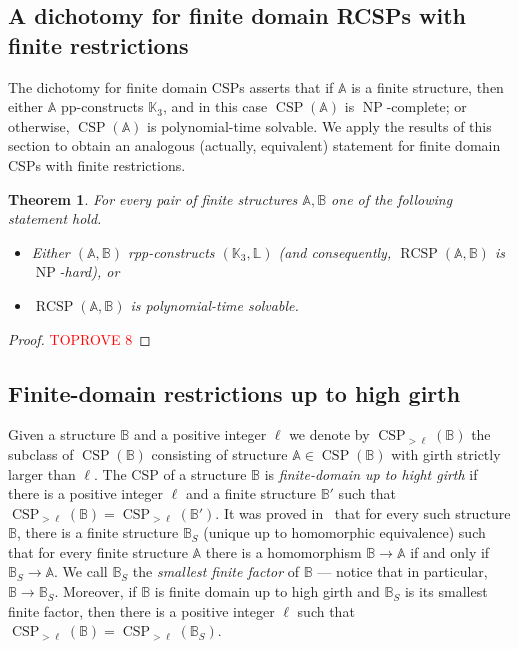 \documentclass{article}
\newtheorem{theorem}{Theorem}
\theoremstyle{definition}
\theoremstyle{remark}
\DeclareMathOperator{\NP}{NP}
\DeclareMathOperator{\CSP}{CSP}
\DeclareMathOperator{\RCSP}{RCSP}
\newcommand{\bA}{{\mathbb A}}
\newcommand{\bB}{{\mathbb B}}
\newcommand{\bK}{{\mathbb K}}
\newcommand{\bL}{{\mathbb L}}
\begin{document}
\subsection{A dichotomy for finite domain RCSPs with finite restrictions}

The dichotomy for finite domain CSPs asserts that if $\bA$ is a finite structure, then
either $\bA$ pp-constructs $\bK_3$, and in this case $\CSP(\bA)$ is $\NP$-complete; or otherwise,
$\CSP(\bA)$ is polynomial-time solvable. We apply the results of this section to obtain an
analogous (actually, equivalent) statement for finite domain CSPs with finite restrictions. 

\begin{theorem}\label{thm:finite-RCSP-dichotomy}
    For every pair of finite structures $\bA,\bB$ one of the following statement hold.
    \begin{itemize}
        \item Either $(\bA,\bB)$ rpp-constructs $(\bK_3,\bL)$ (and consequently, 
        $\RCSP(\bA,\bB)$ is $\NP$-hard), or
        \item $\RCSP(\bA,\bB)$ is polynomial-time solvable. 
    \end{itemize}
\end{theorem}
\begin{proof}\textcolor{red}{TOPROVE 8}\end{proof}




\subsection{Finite-domain restrictions up to high girth}
\label{subsect:finite-domain-up-to-high-girth}

Given a structure $\bB$ and a positive integer $\ell$ we denote by $\CSP_{>\ell}(\bB)$
the subclass of $\CSP(\bB)$ consisting of structure $\bA\in \CSP(\bB)$ with girth
strictly larger than $\ell$. The CSP of a structure $\bB$ is \emph{finite-domain up to hight girth}
if there is a positive integer $\ell$ and a finite structure $\bB'$ such that $\CSP_{>\ell}(\bB) = \CSP_{>\ell}(\bB')$.
It was proved in~\cite{guzmanGMSNP} that for every such structure $\bB$, there is a finite
structure $\bB_S$ (unique up to homomorphic equivalence) such that for every finite structure
$\bA$ there is a homomorphism $\bB\to \bA$ if and only if $\bB_S\to \bA$. We call $\bB_S$
the \emph{smallest finite factor} of $\bB$ --- notice that in particular, $\bB\to \bB_S$.
Moreover, if $\bB$ is finite domain up to high girth  and $\bB_S$ is its smallest finite factor,
then there is a positive integer $\ell$ such that
$\CSP_{>\ell}(\bB) =\CSP_{>\ell}(\bB_S)$\cite[Corollary 10]{guzmanGMSNP}.
\end{document}
